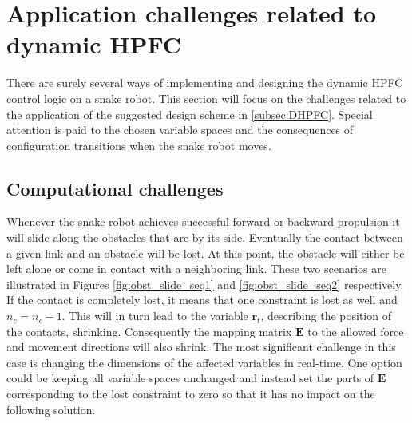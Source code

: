 




\section{Application challenges related to dynamic HPFC}

There are surely several ways of implementing and designing the dynamic HPFC control logic on a snake robot. This section will focus on the challenges related to the application of the suggested design scheme in \ref{subsec:DHPFC}. Special attention is paid to the chosen variable spaces and the consequences of configuration transitions when the snake robot moves.

\subsection{Computational challenges}

Whenever the snake robot achieves successful forward or backward propulsion it will slide along the obstacles that are by its side. Eventually the contact between a given link and an obstacle will be lost. At this point, the obstacle will either be left alone or come in contact with a neighboring link. These two scenarios are illustrated in Figures \ref{fig:obst_slide_seq1} and \ref{fig:obst_slide_seq2} respectively. If the contact is completely lost, it means that one constraint is lost as well and $n_c = n_c - 1$. This will in turn lead to the variable $\mathbf{r}_t$, describing the position of the contacts, shrinking. Consequently the mapping matrix $\mathbf{E}$ to the allowed force and movement directions will also shrink. The most significant challenge in this case is changing the dimensions of the affected variables in real-time. One option could be keeping all variable spaces unchanged and instead set the parts of $\mathbf{E}$ corresponding to the lost constraint to zero so that it has no impact on the following solution.

